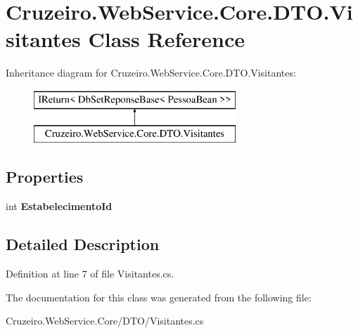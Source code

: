 \hypertarget{class_cruzeiro_1_1_web_service_1_1_core_1_1_d_t_o_1_1_visitantes}{}\section{Cruzeiro.\+Web\+Service.\+Core.\+D\+T\+O.\+Visitantes Class Reference}
\label{class_cruzeiro_1_1_web_service_1_1_core_1_1_d_t_o_1_1_visitantes}
Inheritance diagram for Cruzeiro.\+Web\+Service.\+Core.\+D\+T\+O.\+Visitantes\+:\begin{figure}[H]
\begin{center}
\leavevmode
\includegraphics[height=2.000000cm]{class_cruzeiro_1_1_web_service_1_1_core_1_1_d_t_o_1_1_visitantes}
\end{center}
\end{figure}
\subsection*{Properties}
\begin{DoxyCompactItemize}
\item 
int {\bfseries Estabelecimento\+Id}\hypertarget{class_cruzeiro_1_1_web_service_1_1_core_1_1_d_t_o_1_1_visitantes_a6e386a388314057b7d85ad686120882c}{}\label{class_cruzeiro_1_1_web_service_1_1_core_1_1_d_t_o_1_1_visitantes_a6e386a388314057b7d85ad686120882c}

\end{DoxyCompactItemize}


\subsection{Detailed Description}


Definition at line 7 of file Visitantes.\+cs.



The documentation for this class was generated from the following file\+:\begin{DoxyCompactItemize}
\item 
Cruzeiro.\+Web\+Service.\+Core/\+D\+T\+O/Visitantes.\+cs\end{DoxyCompactItemize}

